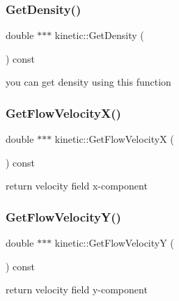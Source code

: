 \mbox{\label{classkinetic_add83c6ebb9fbceed77e42abff478d56a}} 
\subsubsection{\texorpdfstring{Get\+Density()}{GetDensity()}}
{\footnotesize\ttfamily double $\ast$$\ast$$\ast$ kinetic\+::\+Get\+Density (\begin{DoxyParamCaption}{ }\end{DoxyParamCaption}) const}



you can get density using this function 

\mbox{\label{classkinetic_ad7344c18f324d71b943928da869c9a09}} 
\subsubsection{\texorpdfstring{Get\+Flow\+Velocity\+X()}{GetFlowVelocityX()}}
{\footnotesize\ttfamily double $\ast$$\ast$$\ast$ kinetic\+::\+Get\+Flow\+VelocityX (\begin{DoxyParamCaption}{ }\end{DoxyParamCaption}) const}



return velocity field x-\/component 

\mbox{\label{classkinetic_a7c07f65ef9e49e1a513925f6280ae0bc}} 
\subsubsection{\texorpdfstring{Get\+Flow\+Velocity\+Y()}{GetFlowVelocityY()}}
{\footnotesize\ttfamily double $\ast$$\ast$$\ast$ kinetic\+::\+Get\+Flow\+VelocityY (\begin{DoxyParamCaption}{ }\end{DoxyParamCaption}) const}



return velocity field y-\/component 

